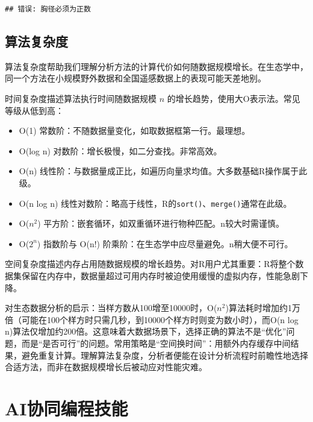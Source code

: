 \documentclass[
  twoside,12pt,fontset=none]{ctexbook}
\providecommand{\tightlist}{%
  \setlength{\itemsep}{0pt}\setlength{\parskip}{0pt}}
\begin{document}
\begin{verbatim}
## 错误: 胸径必须为正数
\end{verbatim}

\hypertarget{ux7b97ux6cd5ux590dux6742ux5ea6}{%
\subsection{算法复杂度}\label{ux7b97ux6cd5ux590dux6742ux5ea6}}

算法复杂度帮助我们理解分析方法的计算代价如何随数据规模增长。在生态学中，同一个方法在小规模野外数据和全国遥感数据上的表现可能天差地别。

时间复杂度描述算法执行时间随数据规模 \(n\) 的增长趋势，使用大O表示法。常见等级从低到高：

\begin{itemize}
\tightlist
\item
  O(1) 常数阶：不随数据量变化，如取数据框第一行。最理想。
\item
  O(log n) 对数阶：增长极慢，如二分查找。非常高效。
\item
  O(n) 线性阶：与数据量成正比，如遍历向量求均值。大多数基础R操作属于此级。
\item
  O(n log n) 线性对数阶：略高于线性，R的\texttt{sort()}、\texttt{merge()}通常在此级。
\item
  O(\(n^2\)) 平方阶：嵌套循环，如双重循环进行物种匹配。n较大时需谨慎。
\item
  O(\(2^n\)) 指数阶与 O(n!) 阶乘阶：在生态学中应尽量避免。n稍大便不可行。
\end{itemize}

空间复杂度描述内存占用随数据规模的增长趋势。对R用户尤其重要：R将整个数据集保留在内存中，数据量超过可用内存时被迫使用缓慢的虚拟内存，性能急剧下降。

对生态数据分析的启示：当样方数从100增至10000时，O(\(n^2\))算法耗时增加约1万倍（可能在100个样方时只需几秒，到10000个样方时则变为数小时），而O(n log n)算法仅增加约200倍。这意味着大数据场景下，选择正确的算法不是``优化''问题，而是``是否可行''的问题。常用策略是``空间换时间''：用额外内存缓存中间结果，避免重复计算。理解算法复杂度，分析者便能在设计分析流程时前瞻性地选择合适方法，而非在数据规模增长后被动应对性能灾难。

\hypertarget{aiux534fux540cux7f16ux7a0bux6280ux80fd}{%
\section{AI协同编程技能}\label{aiux534fux540cux7f16ux7a0bux6280ux80fd}}
\end{document}

